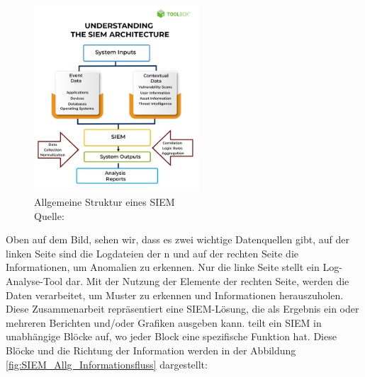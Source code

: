 
\begin{figure}[H]
   \centering
   \includegraphics[width=0.55\textwidth]{assets/2_p1.png}
   \caption[Allgemeine Struktur von \gls{SIEM}]
   {Allgemeine Struktur eines \gls{SIEM}\\Quelle: \citep{Mohanan_What} }
   \label{fig:SIEM_Allg_Struktur}
   \centering
\end{figure}

Oben auf dem Bild, sehen wir, dass es zwei wichtige Datenquellen gibt, auf der linken Seite sind die Logdateien der n und auf der rechten Seite die Informationen, um Anomalien zu erkennen. Nur die linke Seite stellt ein Log-Analyse-Tool dar. Mit der Nutzung der Elemente der rechten Seite, werden die Daten verarbeitet, um Muster zu erkennen und Informationen herauszuholen. Diese Zusammenarbeit repräsentiert eine \gls{SIEM}-Lösung, die als Ergebnis ein oder mehreren Berichten und/oder Grafiken ausgeben kann. \cite{Granadillo_SIEM} teilt ein \gls{SIEM} in unabhängige Blöcke auf, wo jeder Block eine spezifische Funktion hat. Diese Blöcke und die Richtung der Information werden in der Abbildung \ref{fig:SIEM_Allg_Informationsfluss} dargestellt:




